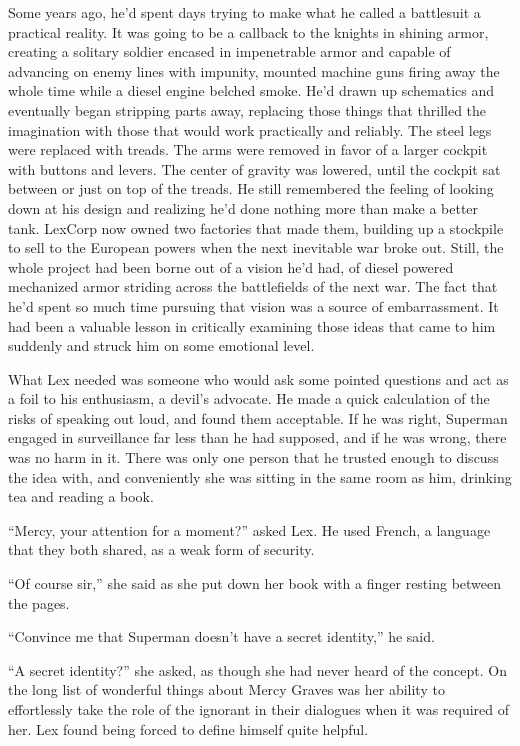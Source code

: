 Some years ago, he'd spent days trying to make what he called a
battlesuit a practical reality. It was going to be a callback to the
knights in shining armor, creating a solitary soldier encased in
impenetrable armor and capable of advancing on enemy lines with
impunity, mounted machine guns firing away the whole time while a diesel
engine belched smoke. He'd drawn up schematics and eventually began
stripping parts away, replacing those things that thrilled the
imagination with those that would work practically and reliably. The
steel legs were replaced with treads. The arms were removed in favor of
a larger cockpit with buttons and levers. The center of gravity was
lowered, until the cockpit sat between or just on top of the treads. He
still remembered the feeling of looking down at his design and realizing
he'd done nothing more than make a better tank. LexCorp now owned two
factories that made them, building up a stockpile to sell to the
European powers when the next inevitable war broke out. Still, the whole
project had been borne out of a vision he'd had, of diesel powered
mechanized armor striding across the battlefields of the next war. The
fact that he'd spent so much time pursuing that vision was a source of
embarrassment. It had been a valuable lesson in critically examining
those ideas that came to him suddenly and struck him on some emotional
level.

What Lex needed was someone who would ask some pointed questions and act
as a foil to his enthusiasm, a devil's advocate. He made a quick
calculation of the risks of speaking out loud, and found them
acceptable. If he was right, Superman engaged in surveillance far less
than he had supposed, and if he was wrong, there was no harm in it.
There was only one person that he trusted enough to discuss the idea
with, and conveniently she was sitting in the same room as him, drinking
tea and reading a book.

``Mercy, your attention for a moment?'' asked Lex. He used French, a
language that they both shared, as a weak form of security.

``Of course sir,'' she said as she put down her book with a finger
resting between the pages.

``Convince me that Superman doesn't have a secret identity,'' he said.

``A secret identity?'' she asked, as though she had never heard of the
concept. On the long list of wonderful things about Mercy Graves was her
ability to effortlessly take the role of the ignorant in their dialogues
when it was required of her. Lex found being forced to define himself
quite helpful.

